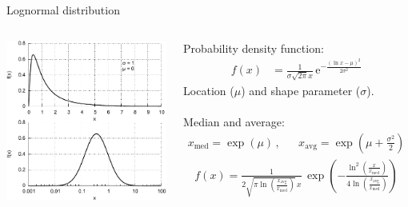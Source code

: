 \begin{frame}[c,label=lognormal_distribution]{Lognormal distribution}{}
	\begin{columns}[c]
		
		\includegraphics[width=\textwidth]{../figures_of_mine/gnuplots/lognormal_semi_log.pdf}

	
		\small Probability density function:
		\begin{align}
			f(x) &= \frac{1}{\sigma \sqrt{2 \pi} x} \, \text{e}^{- \frac{(\ln x - \mu)^2}{2 \sigma^2}}	\nonumber
		\end{align}
		Location ($\mu$) and shape parameter ($\sigma$).\\\ \\
		Median and average:
		\begin{align}
			x_\text{med} = \exp\left(\mu\right)\,,	&	&	x_\text{avg} = \exp\left(\mu + \frac{\sigma^2}{2}\right)	\nonumber
		\end{align}
		\begin{align}
			f(x) = \frac{1}{2 \sqrt{\pi \ln\left(\frac{x_\text{avg}}{x_\text{med}}\right)} \, x} \, \exp\left(- \frac{\ln^2\left(\frac{x}{x_\text{med}}\right)}{4 \ln\left(\frac{x_\text{avg}}{x_\text{med}}\right)}\right)	\nonumber
		\end{align}

	\end{columns}
\end{frame}
